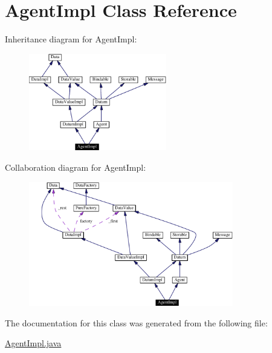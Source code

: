 \hypertarget{classAgentImpl}{
\section{Agent\-Impl  Class Reference}
\label{classAgentImpl}
}
Inheritance diagram for Agent\-Impl:\begin{figure}[H]
\begin{center}
\leavevmode
\includegraphics[width=170pt]{classAgentImpl__inherit__graph}
\end{center}
\end{figure}
Collaboration diagram for Agent\-Impl:\begin{figure}[H]
\begin{center}
\leavevmode
\includegraphics[width=253pt]{classAgentImpl__coll__graph}
\end{center}
\end{figure}


The documentation for this class was generated from the following file:\begin{CompactItemize}
\item 
\hyperlink{AgentImpl_8java-source}{Agent\-Impl.java}\end{CompactItemize}
